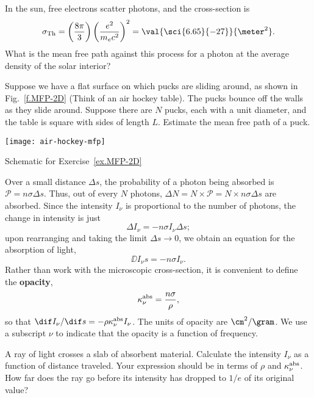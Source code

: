 \begin{exercisebox}\label{ex.MFP}
    In the sun, free electrons scatter photons, and the cross-section is
    \[
    \sigma_{\mathrm{Th}} = \left(\frac{8\pi}{3}\right)\left(\frac{e^2}{m_e c^2}\right)^2 = \val{\sci{6.65}{-27}}{\meter^2}.
    \]
    What is the mean free path against this process for a photon at the average density of the solar interior?
\end{exercisebox}

\begin{exercisebox}\label{ex.MFP-2D}
    Suppose we have a flat surface on which pucks are sliding around, as shown in Fig.~\ref{f.MFP-2D} (Think of an air hockey table). The pucks bounce off the walls as they slide around.  Suppose there are $N$ pucks, each with a unit diameter, and the table is square with sides of length $L$.  Estimate the mean free path of a puck.
\end{exercisebox}

\begin{marginfigure}[-5\baselineskip]
    \texttt{[image: air-hockey-mfp]}
    \caption[Mean free path of a hockey puck]{\label{f.MFP-2D}Schematic for Exercise~\ref{ex.MFP-2D}}
\end{marginfigure}

 Over a small distance $\Delta s$, the probability of a photon being absorbed is $\mathcal{P} = n\sigma\Delta s$. Thus, out of every $N$ photons, $\Delta N = N \times\mathcal{P} = N\times n\sigma\Delta s$ are absorbed. Since the intensity $I_{\nu}$ is proportional to the number of photons, the change in intensity is just
\[ \Delta I_{\nu} = -n\sigma I_{\nu}\Delta s; \]
upon rearranging and taking the limit $\Delta s\to0$, we obtain an equation for the absorption of light,
\begin{equation}\label{e.absorption-microscopic}
\DD{I_{\nu}}{s} = -n\sigma I_{\nu}.
\end{equation}
Rather than work with the microscopic cross-section, it is convenient to define the \textbf{opacity},
\[
	\kappa_\nu^{\mathrm{abs}} = \frac{n\sigma}{\rho},
\]
so that $\dif I_{\nu}/\dif s = -\rho\kapabs I_{\nu}$. The units of opacity are $\cm^{2}/\gram$. We use a subscript $\nu$ to indicate that the opacity is a function of frequency.

\begin{exercisebox}
A ray of light crosses a slab of absorbent material. Calculate the intensity $I_{\nu}$ as a function of distance traveled. Your expression should be in terms of $\rho$ and $\kappa_\nu^{\mathrm{abs}}$. How far does the ray go before its intensity has dropped to $1/e$ of its original value?
\end{exercisebox}

